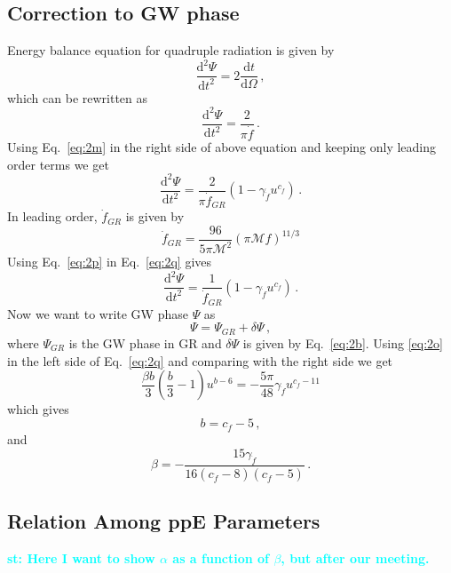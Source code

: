 \documentclass[11pt]{article}
\newcommand{\st}[1]{\textcolor{cyan}{\textbf{st: #1}} }
\begin{document}
\subsection{Correction to GW phase}
\hspace{15.5pt}Energy balance equation for quadruple radiation is given by\cite{Stein:2013wza}
\begin{equation}
\frac{\mathrm{d^2}\Psi}{\mathrm{d} t^2}=2\frac{\mathrm{d} t}{\mathrm{d}\Omega}\,,
\end{equation}
which can be rewritten as
\begin{equation}
\frac{\mathrm{d^2}\Psi}{\mathrm{d} t^2}=\frac{2}{\pi \dot{f}}\,.
\end{equation}
Using Eq.~\eqref{eq:2m} in the right side of above equation and keeping only leading order terms we get
\begin{equation}\label{eq:2q}
\frac{\mathrm{d^2}\Psi}{\mathrm{d} t^2}=\frac{2}{\pi\dot{f}_{GR}}(1-\gamma_{\dot{f}}u^{c_{\dot{f}}})\,.
\end{equation}
In leading order, $\dot{f}_{GR}$ is given by \cite{VanDenBroeck:2006qu}
\begin{equation}\label{eq:2p}
\dot{f}_{GR}=\frac{96}{5\pi\mathcal{M}^2}(\pi \mathcal{M}f)^{11/3}
\end{equation}
Using Eq.~\eqref{eq:2p} in Eq.~\eqref{eq:2q} gives
\begin{equation}
\frac{\mathrm{d^2}\Psi}{\mathrm{d} t^2}=\frac{1}{\dot{f}_{GR}}(1-\gamma_{\dot{f}}u^{c_{\dot{f}}})\,.
\end{equation}
Now we want to write GW phase $\Psi$ as 
\begin{equation}\label{eq:2o}
\Psi=\Psi_{GR}+\delta\Psi\,,
\end{equation}
where $\Psi_{GR}$ is the GW phase in GR and $\delta\Psi$ is given by Eq.~\eqref{eq:2b}. Using \eqref{eq:2o} in the left side of Eq.~\eqref{eq:2q} and comparing with the right side we get
\begin{equation}
\frac{\beta b}{3}\left(\frac{b}{3}-1\right)u^{b-6}=-\frac{5\pi}{48}\gamma_{\dot{f}}u^{c_{\dot{f}}-11}
\end{equation}
which gives
\begin{equation}
b=c_{\dot{f}}-5\,,
\end{equation}
and
\begin{equation}
\beta=-\frac{15 \text{$\gamma_{\dot{f}} $}}{16 (\text{$c_{\dot{f}}$}-8) (\text{$c_{\dot{f}}$}-5)}\,.
\end{equation}

\subsection{Relation Among ppE Parameters}
\st{Here I want to show $\alpha$ as a function of $\beta$, but after our meeting.}
\end{document}
